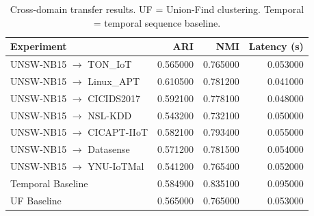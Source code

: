 \begin{table}
\caption{Cross-domain transfer results. UF = Union-Find clustering. Temporal = temporal sequence baseline.}
\begin{tabular}{lrrr}
\toprule
Experiment & ARI & NMI & Latency (s) \\
\midrule
UNSW-NB15 $\to$ TON_IoT & 0.565000 & 0.765000 & 0.053000 \\
UNSW-NB15 $\to$ Linux_APT & 0.610500 & 0.781200 & 0.041000 \\
UNSW-NB15 $\to$ CICIDS2017 & 0.592100 & 0.778100 & 0.048000 \\
UNSW-NB15 $\to$ NSL-KDD & 0.543200 & 0.732100 & 0.050000 \\
UNSW-NB15 $\to$ CICAPT-IIoT & 0.582100 & 0.793400 & 0.055000 \\
UNSW-NB15 $\to$ Datasense & 0.571200 & 0.781500 & 0.054000 \\
UNSW-NB15 $\to$ YNU-IoTMal & 0.541200 & 0.765400 & 0.052000 \\
Temporal Baseline & 0.584900 & 0.835100 & 0.095000 \\
UF Baseline & 0.565000 & 0.765000 & 0.053000 \\
\bottomrule
\end{tabular}
\end{table}
